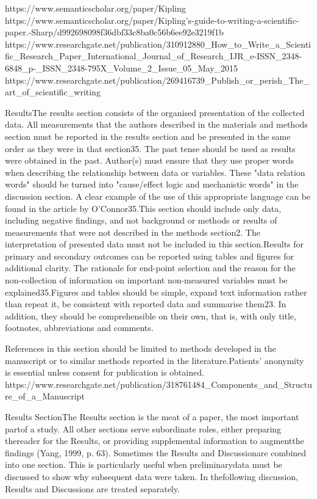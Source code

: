 https://www.semanticscholar.org/paper/Kipling%
https://www.semanticscholar.org/paper/Kipling's-guide-to-writing-a-scientific-paper.-Sharp/d992698098f36dbf33c8ba0c56b6ee92e3219f1b
https://www.researchgate.net/publication/310912880_How_to_Write_a_Scientific_Research_Paper_International_Journal_of_Research_IJR_e-ISSN_2348-6848_p-_ISSN_2348-795X_Volume_2_Issue_05_May_2015
https://www.researchgate.net/publication/269416739_Publish_or_perish_The_art_of_scientific_writing


ResultsThe results section consists of the organised presentation of the collected data. All measurements that the authors described in the materials and methods section must be reported in the results section and be presented in the same order as they were in that section35. The past tense should be used as results were obtained in the past. Author(s) must ensure that they use proper words when describing the relationship between data or variables. These "data relation words" should be turned into "cause/effect logic and mechanistic words" in the discussion section. A clear example of the use of this appropriate language can be found in the article by O'Connor35.This section should include only data, including negative findings, and not background or methods or results of measurements that were not described in the methods section2. The interpretation of presented data must not be included in this section.Results for primary and secondary outcomes can be reported using tables and figures for additional clarity. The rationale for end-point selection and the reason for the non-collection of information on important non-measured variables must be explained35.Figures and tables should be simple, expand text information rather than repeat it, be consistent with reported data and summarise them23. In addition, they should be comprehensible on their own, that is, with only title, footnotes, abbreviations and comments.

References in this section should be limited to methods developed in the manuscript or to similar methods reported in the literature.Patients' anonymity is essential unless consent for publication is obtained.
https://www.researchgate.net/publication/318761484_Components_and_Structure_of_a_Manuscript

Results SectionThe Results section is the meat of a paper, the most important partof a study. All other sections serve subordinate roles, either preparing thereader for the Results, or providing supplemental information to augmentthe findings (Yang, 1999, p. 63). Sometimes the Results and Discussionare combined into one section. This is particularly useful when preliminarydata must be discussed to show why subsequent data were taken. In thefollowing discussion, Results and Discussions are treated separately.


